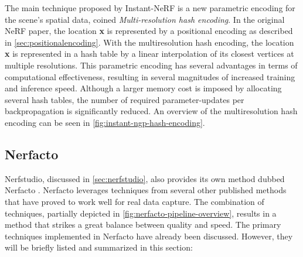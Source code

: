 

The main technique proposed by Instant-NeRF is a new parametric encoding for the scene's spatial data, coined \textit{Multi-resolution hash encoding}. In the original NeRF paper, the location \textbf{x} is represented by a positional encoding as described in \autoref{sec:positionalencoding}. With the multiresolution hash encoding, the location \textbf{x} is represented in a hash table by a linear interpolation of its closest vertices at multiple resolutions. This parametric encoding has several advantages in terms of computational effectiveness, resulting in several magnitudes of increased training and inference speed. Although a larger memory cost is imposed by allocating several hash tables, the number of required parameter-updates per backpropagation is significantly reduced. An overview of the multiresolution hash encoding can be seen in \autoref{fig:instant-ngp-hash-encoding}.


\subsection{Nerfacto} \label{sec:nerfacto}
Nerfstudio, discussed in \autoref{sec:nerfstudio}, also provides its own method dubbed Nerfacto \cite{tancik_nerfstudio_2023}. Nerfacto leverages techniques from several other published methods that have proved to work well for real data capture. The combination of techniques, partially depicted in \autoref{fig:nerfacto-pipeline-overview}, results in a method that strikes a great balance between quality and speed. 
The primary techniques implemented in Nerfacto have already been discussed. However, they will be briefly listed and summarized in this section:

